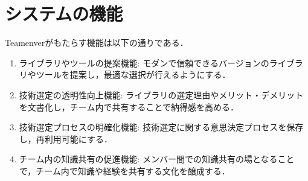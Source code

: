 \documentclass[main]{subfiles}
\begin{document}
\section{システムの機能}
Teamenverがもたらす機能は以下の通りである．
\begin{enumerate}
\item ライブラリやツールの提案機能: モダンで信頼できるバージョンのライブラリやツールを提案し，最適な選択が行えるようにする．

\item 技術選定の透明性向上機能: ライブラリの選定理由やメリット・デメリットを文書化し，チーム内で共有することで納得感を高める．

\item 技術選定プロセスの明確化機能: 技術選定に関する意思決定プロセスを保存し，再利用可能にする．

\item チーム内の知識共有の促進機能: メンバー間での知識共有の場となることで，チーム内で知識や経験を共有する文化を醸成する．
\end{enumerate}
\end{document}
